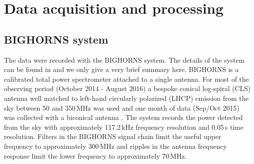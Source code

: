 \documentclass{article}
\begin{document}

\section{Data acquisition and processing}
\label{sec:data_daq_and_proc}

\subsection{BIGHORNS system}
\label{subsec:data_acq}

The data were recorded with the BIGHORNS system. The details of the system can be found in \citep{2015PASA...32....4S,2015ApJ...813...18S} and we only give a very brief summary here.
BIGHORNS is a calibrated total power spectrometer attached to a single antenna. 
For most of the observing period (October 2014 - August 2016) a bespoke conical log-spiral (CLS) antenna well matched to left-hand circularly  polarized (LHCP) 
emission from the sky between 50 and 350\,MHz was used \cite{2015ApJ...813...18S} and one month of data (Sep/Oct 2015) was collected with a biconical antenna \citep{2015PASA...32....4S}.
The system records the power detected from the sky with approximately 117.2\,kHz frequency resolution and 0.05\,s time resolution.
Filters in the BIGHORNS signal chain limit the useful upper frequency to approximately 300\,MHz and ripples in the antenna frequency response limit the lower frequency to approximately 70\,MHz.
\end{document}
